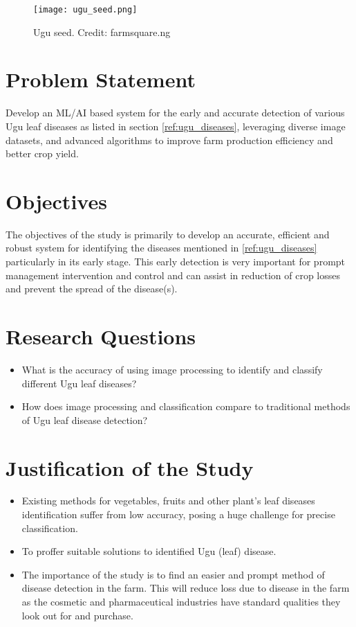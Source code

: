 \begin{figure}[!h]
	\centering
	\texttt{[image: ugu\_seed.png]}
	\caption{Ugu seed. Credit: farmsquare.ng} 
	\label{fig:ugu_seed}
\end{figure}

\newpage
\section{Problem Statement}
Develop an ML/AI based system for the early and accurate detection of various Ugu leaf diseases as listed in section \ref{ref:ugu_diseases}, leveraging diverse image datasets, and advanced algorithms to improve farm production efficiency and better crop yield.

\section{Objectives}
The objectives of the study is primarily to develop an accurate, efficient and robust system for identifying the diseases mentioned in \ref{ref:ugu_diseases} particularly in its early stage. This early detection is very important for prompt management intervention and control and can assist in reduction of crop losses and prevent the spread of the disease(s).

\section{Research Questions}
\begin{itemize}
	\item What is the accuracy of using image processing to identify and classify different Ugu leaf diseases?
	\item How does image processing and classification compare to traditional methods of Ugu leaf disease detection?
\end{itemize}


\section{Justification of the Study}
\begin{itemize}
	\item Existing methods for vegetables, fruits and other plant's leaf diseases identification suffer from low accuracy, posing a huge challenge for precise classification.
	
	\item To proffer suitable solutions to identified Ugu (leaf) disease.
	
	\item The importance of the study is to find an easier and prompt method of disease detection in the farm. This will reduce loss due to disease in the farm as the cosmetic and pharmaceutical industries have standard qualities they look out for and purchase.
\end{itemize}

